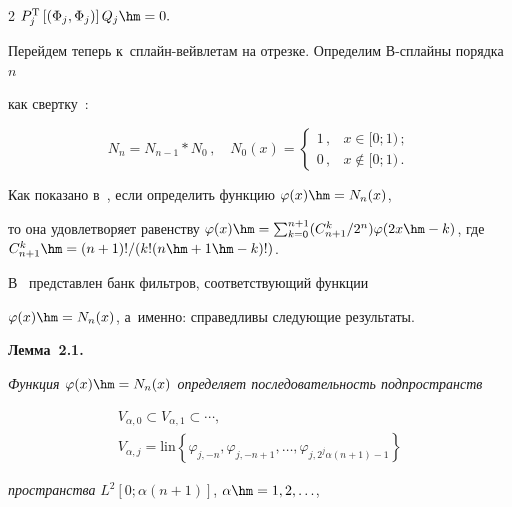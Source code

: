 \begin{multicols}{2}
${P}_{j}^{\mathrm{T}} \left[\left(\Phi _{j}, \Phi _{j} 


\right)\right]{Q}_{j} \hm=0.$





Перейдем теперь к~сплайн-вейв\-ле\-там на отрезке. Определим В-сплай\-ны порядка~$n$  


как свертку~\cite{Chui}:


$$


N_{n} =N_{n-1} *N_{0}\,,\quad


N_{0} (x)=\begin{cases} 


1\,, & x\in [0;1)\,; \\ 


0\,, & x\notin [0;1)\,.


\end{cases}


$$


Как показано в~\cite{Chui}, если определить функцию $\varphi (x)\hm=N_{n} (x)$, 


то она удовлетворяет равенству $\varphi (x)\hm=\sum\nolimits _{k=0}^{n+1}


({C_{n+1}^{k} }/{2^{n}}) \varphi (2x\hm-k)$, где $C_{n+1}^k\hm={(n+1)!}/({k!(n\hm+1\hm-k)!})$.


В~\cite{Yurgu} пред\-став\-лен банк фильт\-ров, соответствующий функции  


$\varphi (x)\hm=N_{n} (x)$, а~именно:  справедливы следующие результаты.





\smallskip





\noindent


\textbf{Лемма~2.1.}\


\textit{Функция $\varphi(x)\hm=N_n(x)$ определяет последовательность подпространств}


\begin{multline*}


V_{\alpha,0}\subset V_{\alpha,1}\subset\cdots,\\


V_{\alpha,j}=\mathrm{lin}\left\{\varphi_{j,-n},\varphi_{j,-n+1},\dots,


\varphi_{j,2^j\alpha(n+1)-1}\right\}


\end{multline*}


\textit{пространства} ${L}^2[0;\alpha(n+1)]$, $\alpha\hm=1,2,\ldots$, 



\end{multicols}
